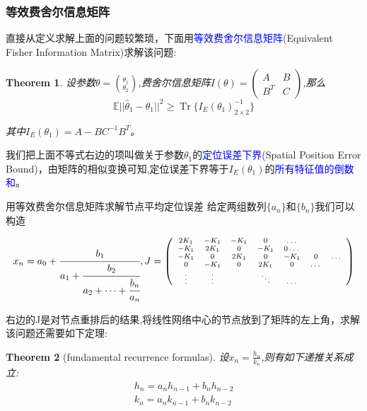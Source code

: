 \documentclass[notheorems,xetex,mathserif,serif]{beamer}
\newenvironment{changemargin}[2]{%
\begin{list}{}{%
\setlength{\topsep}{0pt}%
\setlength{\leftmargin}{#1}%
\setlength{\rightmargin}{#2}%
\setlength{\listparindent}{\parindent}%
\setlength{\itemindent}{\parindent}%
\setlength{\parsep}{\parskip}%
}%
\item[]}{\end{list}}
\DeclareMathOperator{\Tr}{Tr}
\newtheorem{theorem}{Theorem}
\begin{document}
\begin{frame}

    \frametitle{等效费舍尔信息矩阵}
    直接从定义求解上面的问题较繁琐，下面用\textcolor{blue}{等效费舍尔信息矩阵}(Equivalent Fisher Information Matrix)求解该问题:

\begin{theorem}
    设参数$\theta=\binom{\theta_1}{\theta_2}$,费舍尔信息矩阵$I(\theta)=\left(\begin{array}{cc}A&B\\B^T&C\end{array}\right)$,那么\[
    \mathbb{E}{||\hat{\theta}_1-\theta_1||^2}\geq \Tr\{I_E(\theta_1)^{-1}_{2\times 2}\}\]

    其中$I_E(\theta_1)=A-BC^{-1}B^T$。
\end{theorem}
	我们把上面不等式右边的项叫做关于参数$\theta_1$的\textcolor{blue}{定位误差下界}(Spatial Position Error Bound)，由矩阵的相似变换可知,定位误差下界等于$I_E(\theta_1)$的\textcolor{blue}{所有特征值的倒数和}。
\end{frame}
\begin{frame}{用等效费舍尔信息矩阵求解节点平均定位误差}
给定两组数列$\{a_n\}$和$\{b_n\}$我们可以构造
\begin{changemargin}{-1cm}{-1cm}
\[
x_n=a_0+\cfrac{b_1}{a_1+\cfrac{b_2}{a_2+\dots+\cfrac{b_n}{a_n}}},\scriptsize{J=\left(
\begin{array}{ccccccc}
2K_1&-K_1&-K_1&0&\dots&&\\
-K_1&2K_1&0&-K_1&0\dots&\\
-K_1&0&2K_1&0&-K_1&0&\dots\\
0&-K_1&0&2K_1&0&\dots&\\
\vdots&\vdots&&\ddots&\dots&\\
\end{array}
\right)}
\]
\end{changemargin}
右边的J是对节点重排后的结果,将线性网络中心的节点放到了矩阵的左上角，求解该问题还需要如下定理:
\begin{theorem}[fundamental recurrence formulas]
设$x_n=\frac{h_n}{k_n}$,则有如下递推关系成立:
\vspace{-3mm}
\begin{eqnarray}
h_n=a_nh_{n-1}+b_nh_{n-2}\\
k_n=a_nk_{n-1}+b_nk_{n-2}
\end{eqnarray}
\end{theorem}
\end{frame}
\end{document}
